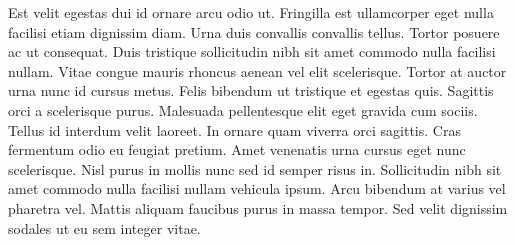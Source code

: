 \documentclass[12pt]{article}
\begin{document}
\begin{multicols*}{2}
    Est velit egestas dui id ornare arcu odio ut. Fringilla est ullamcorper eget nulla facilisi etiam dignissim diam. Urna duis convallis convallis tellus. Tortor posuere ac ut consequat. Duis tristique sollicitudin nibh sit amet commodo nulla facilisi nullam. Vitae congue mauris rhoncus aenean vel elit scelerisque. Tortor at auctor urna nunc id cursus metus. Felis bibendum ut tristique et egestas quis. Sagittis orci a scelerisque purus. Malesuada pellentesque elit eget gravida cum sociis. Tellus id interdum velit laoreet. In ornare quam viverra orci sagittis. Cras fermentum odio eu feugiat pretium. Amet venenatis urna cursus eget nunc scelerisque. Nisl purus in mollis nunc sed id semper risus in. Sollicitudin nibh sit amet commodo nulla facilisi nullam vehicula ipsum. Arcu bibendum at varius vel pharetra vel. Mattis aliquam faucibus purus in massa tempor. Sed velit dignissim sodales ut eu sem integer vitae.



    
    
\end{multicols*}
\end{document}
